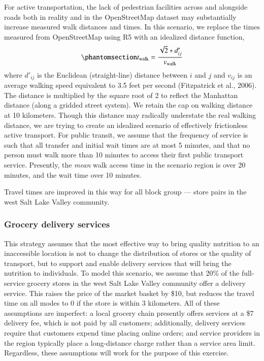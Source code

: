 \documentclass[
  letterpaper,
  number,
  review,
  3p]{elsarticle}
\begin{document}
For active transportation, the lack of pedestrian facilities across and
alongside roads both in reality and in the OpenStreetMap dataset may
substantially increase measured walk distances and times. In this
scenario, we replace the times measured from OpenStreetMap using R5 with
an idealized distance function,
\begin{equation}\phantomsection\label{eq-newwalk}{ 
t_{\mathrm{walk}} = \frac{\sqrt{2} * d'_{ij}}{v_{\mathrm{walk}}}
}\end{equation} where \(d'_{ij}\) is the Euclidean (straight-line)
distance between \(i\) and \(j\) and \(v_{ij}\) is an average walking
speed equivalent to 3.5 feet per second (Fitzpatrick et al., 2006). The
distance is multiplied by the square root of 2 to reflect the Manhattan
distance (along a gridded street system). We retain the cap on walking
distance at 10 kilometers. Though this distance may radically understate
the real walking distance, we are trying to create an idealized scenario
of effectively frictionless active transport. For public transit, we
assume that the frequency of service is such that all transfer and
initial wait times are at most 5 minutes, and that no person must walk
more than 10 minutes to access their first public transport service.
Presently, the \emph{mean} walk access time in the scenario region is
over 20 minutes, and the wait time over 10 minutes.

Travel times are improved in this way for all block group --- store
pairs in the west Salt Lake Valley community.

\subsubsection{Grocery delivery
services}\label{grocery-delivery-services}

This strategy assumes that the most effective way to bring quality
nutrition to an inaccessible location is not to change the distribution
of stores or the quality of transport, but to support and enable
delivery services that will bring the nutrition to individuals. To model
this scenario, we assume that 20\% of the full-service grocery stores in
the west Salt Lake Valley community offer a delivery service. This
raises the price of the market basket by \$10, but reduces the travel
time on all modes to 0 if the store is within 3 kilometers. All of these
assumptions are imperfect: a local grocery chain presently offers
services at a \$7 delivery fee, which is not paid by all customers;
additionally, delivery services require that customers expend time
placing online orders; and service providers in the region typically
place a long-distance charge rather than a service area limit.
Regardless, these assumptions will work for the purpose of this
exercise.
\end{document}
